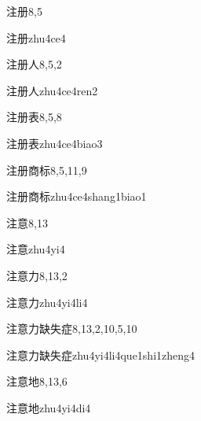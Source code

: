 \begin{entry}{注册}{8,5}
  \begin{phonetics}{注册}{zhu4ce4}
  \end{phonetics}
\end{entry}

\begin{entry}{注册人}{8,5,2}
  \begin{phonetics}{注册人}{zhu4ce4ren2}
  \end{phonetics}
\end{entry}

\begin{entry}{注册表}{8,5,8}
  \begin{phonetics}{注册表}{zhu4ce4biao3}
  \end{phonetics}
\end{entry}

\begin{entry}{注册商标}{8,5,11,9}
  \begin{phonetics}{注册商标}{zhu4ce4shang1biao1}
  \end{phonetics}
\end{entry}

\begin{entry}{注意}{8,13}
  \begin{phonetics}{注意}{zhu4yi4}
  \end{phonetics}
\end{entry}

\begin{entry}{注意力}{8,13,2}
  \begin{phonetics}{注意力}{zhu4yi4li4}
  \end{phonetics}
\end{entry}

\begin{entry}{注意力缺失症}{8,13,2,10,5,10}
  \begin{phonetics}{注意力缺失症}{zhu4yi4li4que1shi1zheng4}
  \end{phonetics}
\end{entry}

\begin{entry}{注意地}{8,13,6}
  \begin{phonetics}{注意地}{zhu4yi4di4}
  \end{phonetics}
\end{entry}

